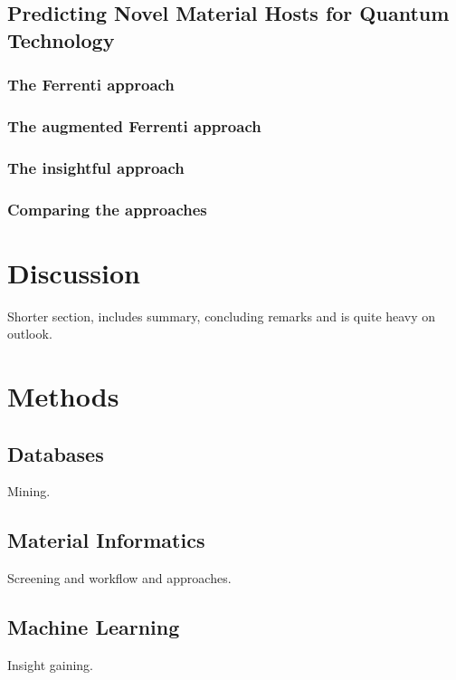 \documentclass[superscriptaddress,unsortedaddress,
 amsmath,amssymb,
 aps,
]{revtex4-2}
\begin{document}
\subsection*{Predicting Novel Material Hosts for Quantum Technology} %
\subsubsection*{The Ferrenti approach} 
\subsubsection*{The augmented Ferrenti approach}
\subsubsection*{The insightful approach}
\subsubsection*{Comparing the approaches}

\section*{Discussion} %
Shorter section, includes summary, concluding remarks and is quite heavy on outlook.  

\section*{Methods}

\subsection*{Databases} %
Mining.  

\subsection*{Material Informatics} %
Screening and workflow and approaches.  

\subsection*{Machine Learning} %
Insight gaining. 
\end{document}

